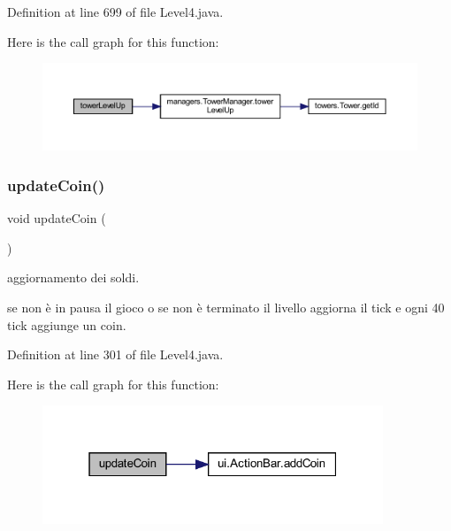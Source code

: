 Definition at line 699 of file Level4.\+java.

Here is the call graph for this function\+:
\nopagebreak
\begin{figure}[H]
\begin{center}
\leavevmode
\includegraphics[width=350pt]{classscenes_1_1_level4_a8a3c715fcfd3d65e1d8241a1fa4965ff_cgraph}
\end{center}
\end{figure}
\mbox{\label{classscenes_1_1_level4_a7ca93fcd8c7440e7b3f64c595a5be28c}} 
\subsubsection{\texorpdfstring{update\+Coin()}{updateCoin()}}
{\footnotesize\ttfamily void update\+Coin (\begin{DoxyParamCaption}{ }\end{DoxyParamCaption})}



aggiornamento dei soldi. 

se non è in pausa il gioco o se non è terminato il livello aggiorna il tick e ogni 40 tick aggiunge un coin. 

Definition at line 301 of file Level4.\+java.

Here is the call graph for this function\+:\nopagebreak
\begin{figure}[H]
\begin{center}
\leavevmode
\includegraphics[width=289pt]{classscenes_1_1_level4_a7ca93fcd8c7440e7b3f64c595a5be28c_cgraph}
\end{center}
\end{figure}
\mbox{\label{classscenes_1_1_level4_af005ec68c869a6acd5e833cba9330a50}} 
